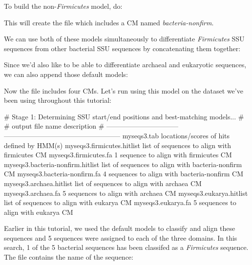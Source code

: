 To build the non-\emph{Firmicutes} model, do:


This will create the file  which includes a CM
named \emph{bacteria-nonfirm}. 

We can use both of these models simultaneously to differentiate
\emph{Firmicutes} SSU sequences from other bacterial SSU sequences by
concatenating them together: 


Since we'd also like to be able to differentiate archaeal and
eukaryotic sequences, we can also append those default models:


Now the file  includes four CMs. Let's run
 using this model on the  dataset
we've been using throughout this tutorial:


\begin{sreoutput}
# Stage 1: Determining SSU start/end positions and best-matching models...
#
# output file name                  description                                        
# --------------------------------  ---------------------------------------------------
  myseqs3.tab                       locations/scores of hits defined by HMM(s)
  myseqs3.firmicutes.hitlist        list of sequences to align with firmicutes CM
  myseqs3.firmicutes.fa                   1 sequence  to align with firmicutes CM
  myseqs3.bacteria-nonfirm.hitlist  list of sequences to align with bacteria-nonfirm CM
  myseqs3.bacteria-nonfirm.fa             4 sequences to align with bacteria-nonfirm CM
  myseqs3.archaea.hitlist           list of sequences to align with archaea CM
  myseqs3.archaea.fa                      5 sequences to align with archaea CM
  myseqs3.eukarya.hitlist           list of sequences to align with eukarya CM
  myseqs3.eukarya.fa                      5 sequences to align with eukarya CM
\end{sreoutput}

Earlier in this tutorial, we used the default models to classify and
align these sequences and 5 sequences were assigned to each of the
three domains. In this search, 1 of the 5 bacterial sequences has been
classifed as a \emph{Firmicutes} sequence. The
 file contains the name of the
sequence:

